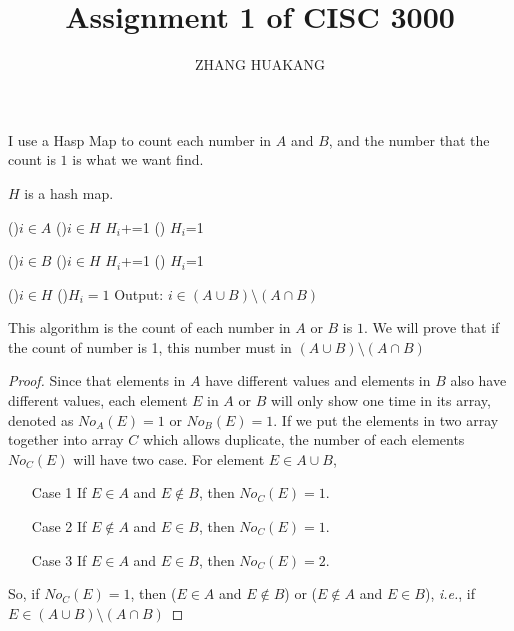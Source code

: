 \documentclass{article}
\title{Assignment 1 of CISC 3000}
\author{ZHANG HUAKANG}
\begin{document}
    \maketitle
    \section{}
    \paragraph{} I use a Hasp Map to count each number in $A$ and $B$, and the number that the count is $1$ is what we want find.

    \begin{algorithm}[H]
        \caption{}
        $H$ is a hash map.

        \For(){$i\in A$}{
            \If(){$i \in H$}{
                $H_i$+=1
            }
            \Else(){
                $H_i$=1
            }
        }

        \For(){$i\in B$}{
            \If(){$i \in H$}{
                $H_i$+=1
            }
            \Else(){
                $H_i$=1
            }
        }

        \For(){$i\in H$}{
            \If(){$H_i=1$}{
               Output: $i \in (A\cup B) \setminus  (A\cap B)$
            }
        }
    \end{algorithm}
    This algorithm is the count of each number in $A$ or $B$ is $1$. We will prove that if the count of number is 1, this number must in $(A\cup B) \setminus  (A\cap B)$
    \begin{proof}
        Since that elements in $A$ have different values and elements in $B$ also have different values, each element $E$ in $A$ or $B$ will only show one time in its array, denoted as $No_A(E)=1$ or $No_B(E)=1$. If we put the elements in two array together into array $C$ which allows duplicate, the number of each elements $No_C(E)$ will have two case. For element $E\in A\cup B$,
        \begin{itemize}
            \item[Case 1] If $E \in A$ and $E \notin B$, then $No_C(E)=1$.
            \item[Case 2] If $E \notin A$ and $E \in B$, then $No_C(E)=1$.
            \item[Case 3] If $E \in A$ and $E \in B$, then $No_C(E)=2$.
        \end{itemize}
        So, if $No_C(E)=1$, then ($E \in A$ and $E \notin B$) or ($E \notin A$ and $E \in B$), \emph{i.e.}, if $E \in (A\cup B) \setminus  (A\cap B)$
    \end{proof}
\end{document}

